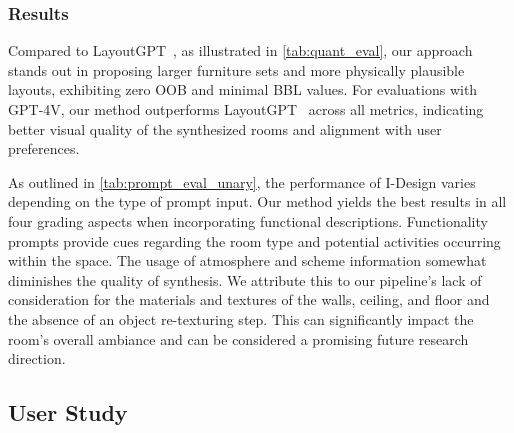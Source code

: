 \documentclass[runningheads]{llncs}
\newcommand{\methodname}{I-Design\xspace}
\begin{document}
\subsubsection{Results}

\begin{table}
\vspace{-3.5em}
\caption{
\textbf{Quantitative evaluation} of \mbox{\methodname} with various prompt types. 
Each prompt type produced 10 instances of a text prompt, each used to generate a single scene. 
These scenes were evaluated with the LLM scheme similarly to~\cref{tab:quant_eval}, and the grades were aggregated across prompt types.
Maximal alignment between visual results and the input user prompt is reached when adding ``Functional'' cues. 
Refer to prompt examples in the Appendix.
}
\label{tab:prompt_eval_unary}
\begin{center}
\vspace{-1em}
\resizebox{1.0\linewidth}{!}{

}
\vspace{-2.5em}
\end{center}
\end{table}

Compared to LayoutGPT~\cite{feng2023layoutgpt}, as illustrated in \cref{tab:quant_eval}, our approach stands out in proposing larger furniture sets and more physically plausible layouts, exhibiting zero OOB and minimal BBL values. For evaluations with GPT-4V, our method outperforms LayoutGPT~\cite{feng2023layoutgpt} across all metrics, indicating better visual quality of the synthesized rooms and alignment with user preferences.

As outlined in \cref{tab:prompt_eval_unary}, 
the performance of \methodname varies depending on the type of prompt input. 
Our method yields the best results in all four grading aspects when incorporating functional descriptions. 
Functionality prompts provide cues regarding the room type and potential activities occurring within the space. 
The usage of atmosphere and scheme information somewhat diminishes the quality of synthesis. 
We attribute this to our pipeline's lack of consideration for the materials and textures of the walls, ceiling, and floor and the absence of an object re-texturing step. 
This can significantly impact the room's overall ambiance and can be considered a promising future research direction.

\subsection{User Study}
\label{sec:user_study}
\end{document}
